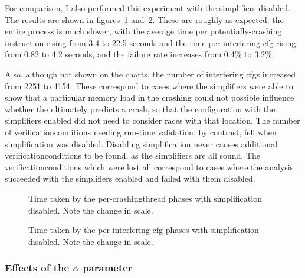 For comparison, I also performed this experiment with the
{\StateMachine} simplifiers disabled.  The results are shown in
figures~\ref{fig:eval:time_breakdown:crashing_no_simple}
and~\ref{fig:eval:time_breakdown:interfering_no_simple}.  These are
roughly as expected: the entire process is much slower, with the
average time per potentially-crashing instruction rising from 3.4 to
22.5 seconds and the time per interfering \gls{cfg} rising from 0.82
to 4.2 seconds, and the failure rate increases from 0.4\% to 3.2\%.

Also, although not shown on the charts, the number of interfering
\glspl{cfg} increased from 2251 to 4154.  These correspond to cases
where the simplifiers were able to show that a particular memory load
in the crashing {\StateMachine} could not possible influence whether
the {\StateMachine} ultimately predicts a crash, so that the
configuration with the simplifiers enabled did not need to consider
races with that location.  The number of \glspl{verificationcondition}
needing run-time validation, by contrast, fell when simplification was
disabled.  Disabling simplification never causes additional
\glspl{verificationcondition} to be found, as the simplifiers are all
sound.  The \glspl{verificationcondition} which were lost all
correspond to cases where the analysis succeeded with the simplifiers
enabled and failed with them disabled.

\begin{figure}
  
  \caption{Time taken by the per-\gls{crashingthread} phases with
    {\StateMachine} simplification disabled.  Note the change in
    scale.}
  \label{fig:eval:time_breakdown:crashing_no_simple}
\end{figure}

\begin{figure}
  
  \caption{Time taken by the per-interfering \gls{cfg} phases with
    {\StateMachine} simplification disabled.  Note the change in
    scale.}
  \label{fig:eval:time_breakdown:interfering_no_simple}
\end{figure}

\subsubsection{Effects of the $\alpha$ parameter}
\label{sect:eval:alpha}


